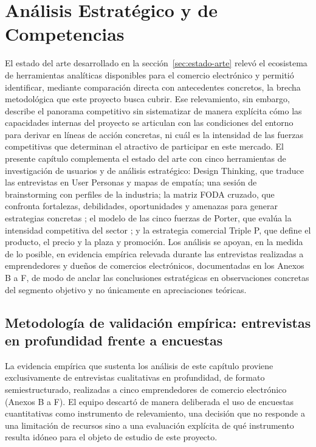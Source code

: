 \chapter{Análisis Estratégico y de Competencias}
\label{cha:analisis-estrategico}

El estado del arte desarrollado en la sección~\ref{sec:estado-arte} relevó el ecosistema de herramientas analíticas disponibles para el comercio electrónico y permitió identificar, mediante comparación directa con antecedentes concretos, la brecha metodológica que este proyecto busca cubrir. Ese relevamiento, sin embargo, describe el panorama competitivo sin sistematizar de manera explícita cómo las capacidades internas del proyecto se articulan con las condiciones del entorno para derivar en líneas de acción concretas, ni cuál es la intensidad de las fuerzas competitivas que determinan el atractivo de participar en este mercado. El presente capítulo complementa el estado del arte con cinco herramientas de investigación de usuarios y de análisis estratégico: Design Thinking, que traduce las entrevistas en User Personas y mapas de empatía; una sesión de brainstorming con perfiles de la industria; la matriz FODA cruzado, que confronta fortalezas, debilidades, oportunidades y amenazas para generar estrategias concretas \parencite{Weihrich1982}; el modelo de las cinco fuerzas de Porter, que evalúa la intensidad competitiva del sector \parencite{Porter1979}; y la estrategia comercial Triple P, que define el producto, el precio y la plaza y promoción. Los análisis se apoyan, en la medida de lo posible, en evidencia empírica relevada durante las entrevistas realizadas a emprendedores y dueños de comercios electrónicos, documentadas en los Anexos B a F, de modo de anclar las conclusiones estratégicas en observaciones concretas del segmento objetivo y no únicamente en apreciaciones teóricas.

\section{Metodología de validación empírica: entrevistas en profundidad frente a encuestas}
\label{sec:metodologia-entrevistas}

La evidencia empírica que sustenta los análisis de este capítulo proviene exclusivamente de entrevistas cualitativas en profundidad, de formato semiestructurado, realizadas a cinco emprendedores de comercio electrónico (Anexos B a F). El equipo descartó de manera deliberada el uso de encuestas cuantitativas como instrumento de relevamiento, una decisión que no responde a una limitación de recursos sino a una evaluación explícita de qué instrumento resulta idóneo para el objeto de estudio de este proyecto.

